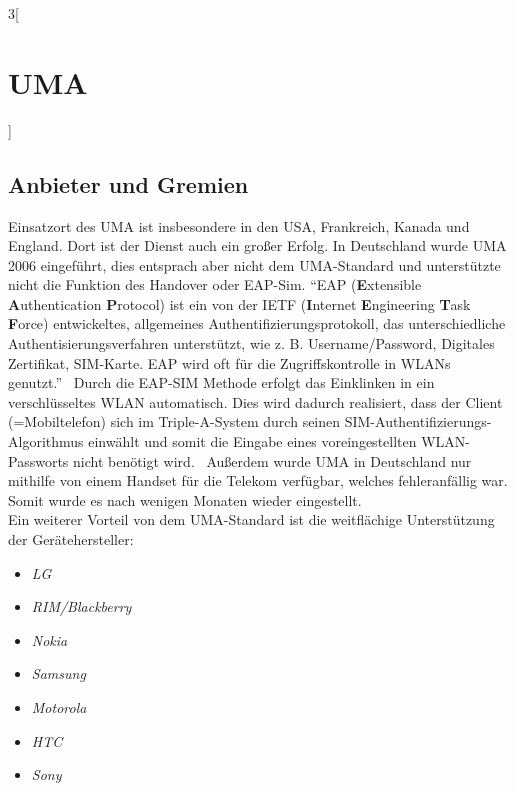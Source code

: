 \begin{multicols}{3}[\section{UMA}]
\subsection*{Anbieter und Gremien}
Einsatzort des UMA ist insbesondere in den USA, Frankreich, Kanada und England. Dort ist der Dienst auch ein großer Erfolg. In Deutschland wurde UMA 2006 eingeführt, dies entsprach aber nicht dem UMA-Standard und unterstützte nicht die Funktion des Handover oder EAP-Sim. \enquote{EAP (\textbf{E}xtensible \textbf{A}uthentication \textbf{P}rotocol) ist ein von der IETF (\textbf{I}nternet \textbf{E}ngineering \textbf{T}ask \textbf{F}orce) entwickeltes, allgemeines Authentifizierungsprotokoll, das unterschiedliche Authentisierungsverfahren unterstützt, wie z. B. Username/Password, Digitales Zertifikat, SIM-Karte. EAP wird oft für die Zugriffskontrolle in WLANs genutzt.}~\cite{uma.13} Durch die EAP-SIM Methode erfolgt das Einklinken in ein verschlüsseltes WLAN automatisch. Dies wird dadurch realisiert, dass der Client (=Mobiltelefon) sich im Triple-A-System durch seinen SIM-Authentifizierungs-Algorithmus einwählt und somit die Eingabe eines voreingestellten WLAN-Passworts nicht benötigt wird.~\cite{uma.13} 
Außerdem wurde UMA in Deutschland nur mithilfe von einem Handset für die Telekom verfügbar, welches fehleranfällig war. Somit wurde es nach wenigen Monaten wieder eingestellt.\\
Ein weiterer Vorteil von dem UMA-Standard ist die weitflächige Unterstützung der Gerätehersteller:
\begin{itemize}
	\item \textit{LG}
	\item \textit{RIM/Blackberry}
	\item \textit{Nokia}
	\item \textit{Samsung}
	\item \textit{Motorola}
	\item \textit{HTC} 
	\item \textit{Sony}
\end{itemize}~\cite{uma.3}
\end{multicols}

\newpage
